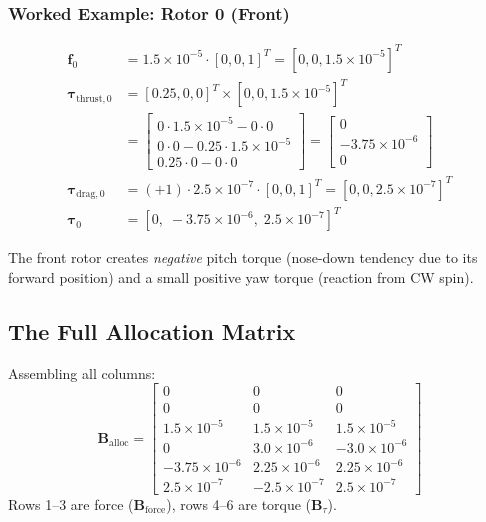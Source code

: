\documentclass[12pt, a4paper]{article}
\newcommand{\btau}{\bm{\tau}}
\newcommand{\bB}{\bm{B}}
\begin{document}
\subsubsection{Worked Example: Rotor 0 (Front)}

\begin{align}
    \bm{f}_0 &= 1.5 \times 10^{-5} \cdot [0, 0, 1]^T = [0, 0, 1.5 \times 10^{-5}]^T \\
    \btau_{\text{thrust},0} &= [0.25, 0, 0]^T \times [0, 0, 1.5 \times 10^{-5}]^T \\
    &= \begin{bmatrix}
        0 \cdot 1.5\times10^{-5} - 0 \cdot 0 \\
        0 \cdot 0 - 0.25 \cdot 1.5\times10^{-5} \\
        0.25 \cdot 0 - 0 \cdot 0
    \end{bmatrix}
    = \begin{bmatrix} 0 \\ -3.75 \times 10^{-6} \\ 0 \end{bmatrix} \\
    \btau_{\text{drag},0} &= (+1) \cdot 2.5 \times 10^{-7} \cdot [0, 0, 1]^T = [0, 0, 2.5 \times 10^{-7}]^T \\
    \btau_0 &= [0, \; -3.75 \times 10^{-6}, \; 2.5 \times 10^{-7}]^T
\end{align}

The front rotor creates \emph{negative} pitch torque (nose-down tendency due to its forward position) and a small positive yaw torque (reaction from CW spin).

\subsection{The Full Allocation Matrix}

Assembling all columns:
\begin{equation}
    \bB_{\text{alloc}} = \begin{bmatrix}
        0 & 0 & 0 \\
        0 & 0 & 0 \\
        1.5\times10^{-5} & 1.5\times10^{-5} & 1.5\times10^{-5} \\
        0 & 3.0\times10^{-6} & -3.0\times10^{-6} \\
        -3.75\times10^{-6} & 2.25\times10^{-6} & 2.25\times10^{-6} \\
        2.5\times10^{-7} & -2.5\times10^{-7} & 2.5\times10^{-7}
    \end{bmatrix}
\end{equation}
Rows 1--3 are force ($\bB_{\text{force}}$), rows 4--6 are torque ($\bB_\tau$).
\end{document}
